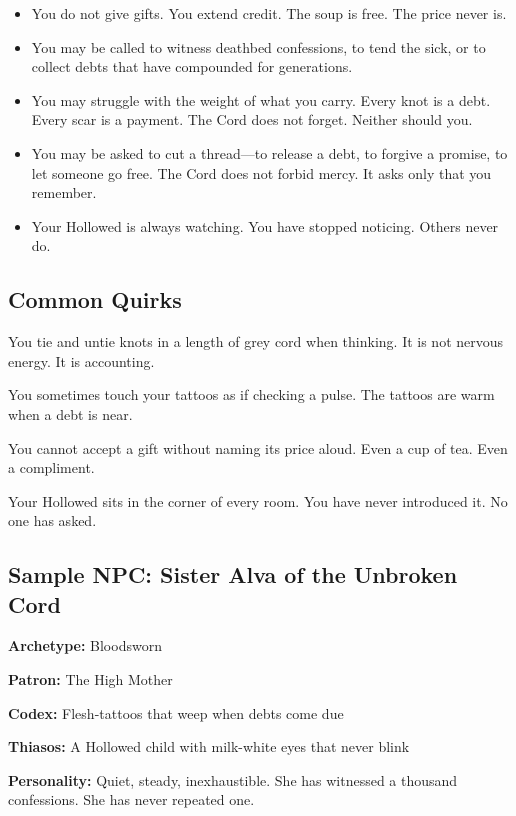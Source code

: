 \begin{itemize}
\item You do not give gifts. You extend credit. The soup is free. The price never is.
\item You may be called to witness deathbed confessions, to tend the sick, or to collect debts that have compounded for generations.
\item You may struggle with the weight of what you carry. Every knot is a debt. Every scar is a payment. The Cord does not forget. Neither should you.
\item You may be asked to cut a thread—to release a debt, to forgive a promise, to let someone go free. The Cord does not forbid mercy. It asks only that you remember.
\item Your Hollowed is always watching. You have stopped noticing. Others never do.
\end{itemize}

\subsection{Common Quirks}

\begin{dice}
\item You tie and untie knots in a length of grey cord when thinking. It is not nervous energy. It is accounting.
\item You sometimes touch your tattoos as if checking a pulse. The tattoos are warm when a debt is near.
\item You cannot accept a gift without naming its price aloud. Even a cup of tea. Even a compliment.
\item Your Hollowed sits in the corner of every room. You have never introduced it. No one has asked.
\end{dice}

\subsection{Sample NPC: Sister Alva of the Unbroken Cord}

\textbf{Archetype:} Bloodsworn

\textbf{Patron:} The High Mother

\textbf{Codex:} Flesh-tattoos that weep when debts come due

\textbf{Thiasos:} A Hollowed child with milk-white eyes that never blink

\textbf{Personality:} Quiet, steady, inexhaustible. She has witnessed a thousand confessions. She has never repeated one.

